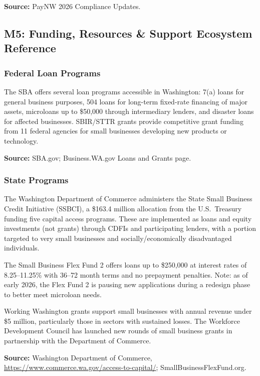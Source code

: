 \documentclass[11pt,letterpaper]{article}
\begin{document}
\textbf{Source:} PayNW 2026 Compliance Updates.

\subsection{M5: Funding, Resources \& Support Ecosystem Reference}

\subsubsection{Federal Loan Programs}

The SBA offers several loan programs accessible in Washington: 7(a) loans for general business purposes, 504 loans for long-term fixed-rate financing of major assets, microloans up to \$50,000 through intermediary lenders, and disaster loans for affected businesses. SBIR/STTR grants provide competitive grant funding from 11 federal agencies for small businesses developing new products or technology.

\textbf{Source:} SBA.gov; Business.WA.gov Loans and Grants page.

\subsubsection{State Programs}

The Washington Department of Commerce administers the State Small Business Credit Initiative (SSBCI), a \$163.4 million allocation from the U.S.\ Treasury funding five capital access programs. These are implemented as loans and equity investments (not grants) through CDFIs and participating lenders, with a portion targeted to very small businesses and socially/economically disadvantaged individuals.

The Small Business Flex Fund 2 offers loans up to \$250,000 at interest rates of 8.25--11.25\% with 36--72 month terms and no prepayment penalties. Note: as of early 2026, the Flex Fund 2 is pausing new applications during a redesign phase to better meet microloan needs.

Working Washington grants support small businesses with annual revenue under \$5 million, particularly those in sectors with sustained losses. The Workforce Development Council has launched new rounds of small business grants in partnership with the Department of Commerce.

\textbf{Source:} Washington Department of Commerce, \url{https://www.commerce.wa.gov/access-to-capital/}; SmallBusinessFlexFund.org.
\end{document}
